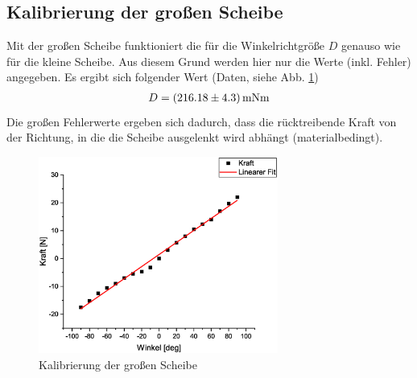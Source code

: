\subsection{Kalibrierung der großen Scheibe}
Mit der großen Scheibe funktioniert die für die Winkelrichtgröße $D$ genauso wie für die kleine Scheibe. Aus diesem Grund werden hier nur die Werte (inkl. Fehler) angegeben. Es ergibt sich folgender Wert (Daten, siehe Abb. \ref{fig:kal2})
\begin{align*}
D = \unit[(216.18 \pm 4.3)]{mN m}
\end{align*}
Die großen Fehlerwerte ergeben sich dadurch, dass die rücktreibende Kraft von der Richtung, in die die Scheibe ausgelenkt wird abhängt (materialbedingt).

\begin{figure}
\begin{center}
\includegraphics[width=0.7\textwidth]{Bilder/kal2.eps}
\caption{Kalibrierung der großen Scheibe}
\label{fig:kal2}
\end{center}
\end{figure}